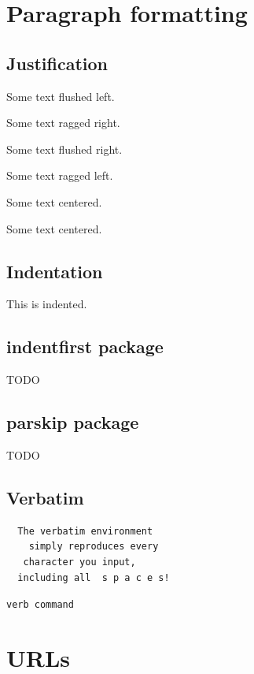 \documentclass{article}
\begin{document}
  \section{Paragraph formatting}

  \subsection{Justification}

  \begin{flushleft}Some text flushed left.\end{flushleft}

  {\raggedright{}Some text ragged right.}

  \begin{flushright}Some text flushed right.\end{flushright}

  {\raggedleft{}Some text ragged left.}

  \begin{center}
    Some text centered.
  \end{center}

  {\centering{}Some text centered.}

  \subsection{Indentation}

  \indent This is indented.

  \subsection{indentfirst package}
  TODO

  \subsection{parskip package}
  TODO

  \subsection{Verbatim}

  \begin{verbatim}
  The verbatim environment
    simply reproduces every
   character you input,
  including all  s p a c e s!
  \end{verbatim}

  \verb+verb command+

  \section{URLs}
\end{document}
